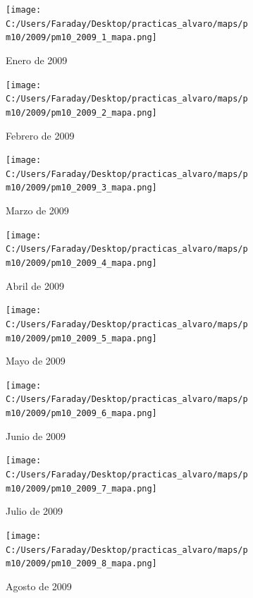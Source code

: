 \documentclass[12pt]{article}
\begin{document}
\newpage

\begin{figure}[H]
\centering
\begin{subfigure}[h]{0.45\textwidth}
\texttt{[image: C:/Users/Faraday/Desktop/practicas\_alvaro/maps/pm10/2009/pm10\_2009\_1\_mapa.png]}
\caption{Enero de 2009}
\label{fig:map-mon-3-1-2009}
\end{subfigure}
%
\begin{subfigure}[H]{0.45\textwidth}
\texttt{[image: C:/Users/Faraday/Desktop/practicas\_alvaro/maps/pm10/2009/pm10\_2009\_2\_mapa.png]}
\caption{Febrero de 2009}
\label{fig:map-mon-3-2-2009}
\end{subfigure}
\caption{}
\end{figure}

\begin{figure}[H]
\centering
\begin{subfigure}[h]{0.45\textwidth}
\texttt{[image: C:/Users/Faraday/Desktop/practicas\_alvaro/maps/pm10/2009/pm10\_2009\_3\_mapa.png]}
\caption{Marzo de 2009}
\label{fig:map-mon-3-3-2009}
\end{subfigure}
%
\begin{subfigure}[H]{0.45\textwidth}
\texttt{[image: C:/Users/Faraday/Desktop/practicas\_alvaro/maps/pm10/2009/pm10\_2009\_4\_mapa.png]}
\caption{Abril de 2009}
\label{fig:map-mon-3-4-2009}
\end{subfigure}
\caption{}
\end{figure}

\begin{figure}[H]
\centering
\begin{subfigure}[h]{0.45\textwidth}
\texttt{[image: C:/Users/Faraday/Desktop/practicas\_alvaro/maps/pm10/2009/pm10\_2009\_5\_mapa.png]}
\caption{Mayo de 2009}
\label{fig:map-mon-3-5-2009}
\end{subfigure}
%
\begin{subfigure}[H]{0.45\textwidth}
\texttt{[image: C:/Users/Faraday/Desktop/practicas\_alvaro/maps/pm10/2009/pm10\_2009\_6\_mapa.png]}
\caption{Junio de 2009}
\label{fig:map-mon-3-6-2009}
\end{subfigure}
\caption{}
\end{figure}

\newpage

\begin{figure}[H]
\centering
\begin{subfigure}[h]{0.45\textwidth}
\texttt{[image: C:/Users/Faraday/Desktop/practicas\_alvaro/maps/pm10/2009/pm10\_2009\_7\_mapa.png]}
\caption{Julio de 2009}
\label{fig:map-mon-3-7-2009}
\end{subfigure}
%
\begin{subfigure}[H]{0.45\textwidth}
\texttt{[image: C:/Users/Faraday/Desktop/practicas\_alvaro/maps/pm10/2009/pm10\_2009\_8\_mapa.png]}
\caption{Agosto de 2009}
\label{fig:map-mon-3-8-2009}
\end{subfigure}
\caption{}
\end{figure}
\end{document}
